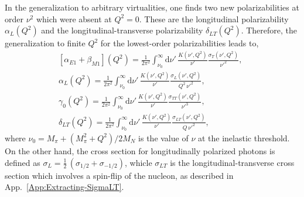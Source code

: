 \documentclass[twocolumn,prc,showpacs,nofootinbib,preprintnumbers,amsmath,amssymb,superscriptaddress]{revtex4-1}
\def\half{\mbox{$\frac{1}{2}$}}
\def\dd{\mathrm{d}}
\begin{document}
In the generalization to arbitrary virtualities, one finds two new polarizabilities at order $\nu^2$ which were absent at $Q^2=0$.
These are the longitudinal polarizability $\alpha_L(Q^2)$ and the longitudinal-transverse polarizability $\delta_{LT}(Q^2)$. 
Therefore, the generalization to finite $Q^2$ for the lowest-order polarizabilities leads to,
\begin{eqnarray}
&&[\alpha_{E1}+\beta_{M1}] (Q^2)= \frac{1}{2 \pi^2} \int_{\nu_0}^\infty \!\!\!\! \dd\nu'\,\frac{K(\nu',Q^2)}{\nu'} \frac{\sigma_T (\nu',Q^2)}{\nu'^2},\qquad \label{Eq:alpha+betaQ2}\\
&&\alpha_L (Q^2)= \frac{1}{2 \pi^2} \int_{\nu_0}^\infty\!\!\!\! \dd\nu'\, \frac{K(\nu',Q^2)}{\nu'}              \frac{\sigma_L (\nu',Q^2)}{Q^2\, \nu'^2}, \label{Eq:alphaLQ2}\\
&&\gamma_0 (Q^2)= \frac{1}{2 \pi^2} \int_{\nu_0}^\infty \!\!\!\! \dd\nu'\,\frac{K(\nu',Q^2)}{\nu'} \frac{\sigma_{TT} (\nu',Q^2)}{\nu'^3}, \label{Eq:gamma0Q2}\\
&&\delta_{LT} (Q^2)= \frac{1}{2 \pi^2} \int_{\nu_0}^\infty \!\!\!\! \dd\nu'\,\frac{K(\nu',Q^2)}{\nu'} \frac{\sigma_{LT} (\nu',Q^2)}{Q\,\nu'^2}, \label{Eq:deltaLTQ2} 
\end{eqnarray}
where $\nu_0=M_\pi + (M_\pi^2+Q^2)/2M_N$ is the value of $\nu$ at the inelastic threshold.
On the other hand, the cross section for longitudinally polarized photons is defined as $\sigma_L=\half\, (\sigma_{1/2}+\sigma_{-1/2})$, whicle $\sigma_{LT}$ is the longitudinal-transverse cross section which involves a spin-flip of the nucleon, as described in App.~\ref{App:Extracting-SigmaLT}.

\end{document}
